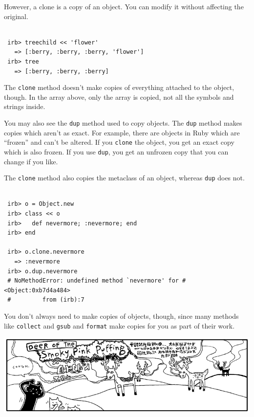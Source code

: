 \documentclass[10pt,twoside]{report}
\begin{document}
However, a clone is a copy of an object.  You can modify it without
affecting the original.


\begin{lstlisting}

 irb> treechild << 'flower'
   => [:berry, :berry, :berry, 'flower']
 irb> tree
   => [:berry, :berry, :berry]

\end{lstlisting}


The \lstinline[breaklines=true]|clone| method doesn't make copies of
everything attached to the object, though.  In the array above, only
the array is copied, not all the symbols and strings inside.

You may also see the \lstinline[breaklines=true]|dup| method used to
copy objects.  The \lstinline[breaklines=true]|dup| method makes
copies which aren't as exact.  For example, there are objects in Ruby
which are ``frozen'' and can't be altered.  If you
\lstinline[breaklines=true]|clone| the object, you get an exact copy
which is also frozen.  If you use \lstinline[breaklines=true]|dup|,
you get an unfrozen copy that you can change if you like.

The \lstinline[breaklines=true]|clone| method also copies the
metaclass of an object, whereas \lstinline[breaklines=true]|dup| does
not.


\begin{lstlisting}

 irb> o = Object.new
 irb> class << o
 irb>   def nevermore; :nevermore; end
 irb> end

 irb> o.clone.nevermore
   => :nevermore
 irb> o.dup.nevermore
 # NoMethodError: undefined method `nevermore' for #<Object:0xb7d4a484>
 #         from (irb):7

\end{lstlisting}



You don't always need to make copies of objects, though, since many
methods like \lstinline[breaklines=true]|collect| and
\lstinline[breaklines=true]|gsub| and
\lstinline[breaklines=true]|format| make copies for you as part of
their work.

	\includegraphics[width=1.0\textwidth]{cache/75.png}
\end{document}
